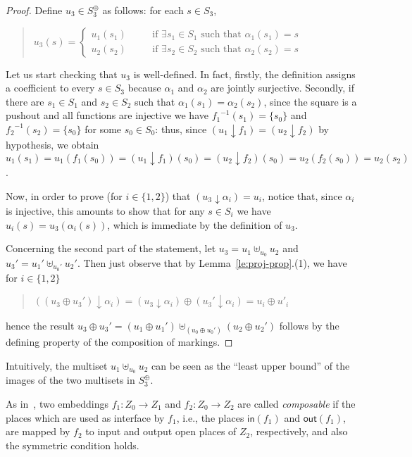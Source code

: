 \documentclass{LMCS}
\newcommand{\inp}[1]{\ensuremath{\mathsf{in}({#1})}}
\newcommand{\out}[1]{\ensuremath{\mathsf{out}({#1})}}
\newcommand{\mjoin}{\ensuremath{\uplus}}
\newcommand{\monSub}[2]{\ensuremath{{#1}_{#2}^\oplus}}
\newcommand{\res}[2]{\ensuremath{({#1}\!\downarrow\!{#2})}}
\begin{document}
\begin{proof} 
Define $u_3 \in \monSub{S}{3}$ as follows: for
  each $s \in S_3$, 
\begin{quote}
$u_3(s) = \left\{
\begin{array}{lll}
u_1(s_1) & \quad & \text{if $\exists s_1 \in S_1$ such that
    $\alpha_1(s_1) = s$}\\
u_2(s_2) & \quad & \text{if $\exists s_2 \in S_2$ such that
    $\alpha_2(s_2) = s$}
\end{array}
\right.
$
\end{quote}
\smallskip
Let us start checking that $u_3$ is well-defined. In fact, firstly, the
definition assigns a coefficient to every $s \in S_3$
because $\alpha_1$ and $\alpha_2$ are jointly surjective. Secondly, if
there are $s_1 \in S_1$ and $s_2 \in S_2$ such
that $\alpha_1(s_1)= \alpha_2(s_2)$, since the square is a pushout and
all functions are injective we have ${f_1}^{-1}(s_1) = \{s_0\}$ and
${f_2}^{-1}(s_2) = \{s_0\}$ for some $s_0 \in S_0$: thus, 
since $\res{u_1}{f_1} = \res{u_2}{f_2}$ by hypothesis, we obtain $u_1(s_1) =
u_1(f_1(s_0)) = \res{u_1}{f_1}(s_0) = \res{u_2}{f_2}(s_0) =
u_2(f_2(s_0)) = u_2(s_2)$.

Now, in order to prove (for $i \in \{1, 2\}$) that
$\res{u_3}{\alpha_i} = u_i$, notice that, since $\alpha_i$ is injective,
this amounts to show that for any $s \in S_i$ we have $u_i(s) =
u_3(\alpha_i(s))$, which is immediate by the definition of $u_3$.

    Concerning the second part of the statement, let $u_3= u_1 \mjoin_{u_0} u_2$ and
  $u_3' = u_1' \mjoin_{u_0'} u_2'$. Then just observe that by
  Lemma~\ref{le:proj-prop}.(1), we have for $i \in \{1,2\}$
  \begin{quote}
    $\res{(u_3 \oplus u_3')}{\alpha_i} =  
    \res{u_3}{\alpha_i} \oplus \res{u_3'}{\alpha_i} =
    u_i \oplus u'_i$
  \end{quote}
  hence the result $u_3 \oplus u_3' = (u_1 \oplus u_1') \mjoin_{(u_0 \oplus u_0')}
  (u_2 \oplus u_2')$ follows by the defining property of the
  composition of markings. 
\end{proof}

Intuitively, the multiset $u_1 \mjoin_{u_0} u_2$ can be seen as the
``least upper bound'' of the images of the two multisets in
$\monSub{S}{3}$.

As in~\cite{BCEH:CMRS,BCEH:CSOP}, two embeddings $f_1
: Z_0 \to Z_1$ and $f_2 : Z_0 \to Z_2$ are called \emph{composable} if the places
which are used as interface by $f_1$, i.e., the places $\inp{f_1}$ and
$\out{f_1}$, are mapped by $f_2$ to input and output open places of $Z_2$,
respectively, and also the symmetric condition holds.
\end{document}
